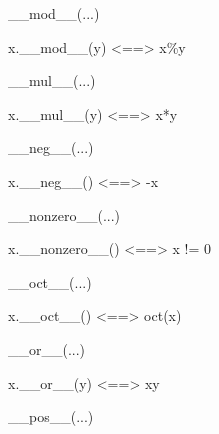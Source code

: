 \documentclass[letterpaper,10pt,english]{sphinxmanual}
\begin{document}
\begin{description}
\begin{description}
\begin{DUlineblock}{0em}
\begin{DUlineblock}{\DUlineblockindent}
\item[] 
\end{DUlineblock}
\item[] \_\_mod\_\_(...)
\item[]
\begin{DUlineblock}{\DUlineblockindent}
\item[] x.\_\_mod\_\_(y) \textless{}==\textgreater{} x\%y
\item[] 
\end{DUlineblock}
\item[] \_\_mul\_\_(...)
\item[]
\begin{DUlineblock}{\DUlineblockindent}
\item[] x.\_\_mul\_\_(y) \textless{}==\textgreater{} x*y
\item[] 
\end{DUlineblock}
\item[] \_\_neg\_\_(...)
\item[]
\begin{DUlineblock}{\DUlineblockindent}
\item[] x.\_\_neg\_\_() \textless{}==\textgreater{} -x
\item[] 
\end{DUlineblock}
\item[] \_\_nonzero\_\_(...)
\item[]
\begin{DUlineblock}{\DUlineblockindent}
\item[] x.\_\_nonzero\_\_() \textless{}==\textgreater{} x != 0
\item[] 
\end{DUlineblock}
\item[] \_\_oct\_\_(...)
\item[]
\begin{DUlineblock}{\DUlineblockindent}
\item[] x.\_\_oct\_\_() \textless{}==\textgreater{} oct(x)
\item[] 
\end{DUlineblock}
\item[] \_\_or\_\_(...)
\item[]
\begin{DUlineblock}{\DUlineblockindent}
\item[] x.\_\_or\_\_(y) \textless{}==\textgreater{} x\textbar{}y
\item[] 
\end{DUlineblock}
\item[] \_\_pos\_\_(...)
\item[]

\end{DUlineblock}
\end{description}
\end{description}
\end{document}
